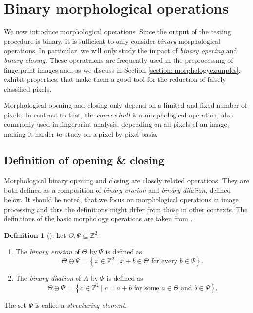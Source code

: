 \documentclass[a4paper,12pt]{article}
\theoremstyle{plain}
\theoremstyle{definition}
\newtheorem{definition}[theorem]{Definition}
\begin{document}
\newpage



\section{Binary morphological operations}\label{section: morphologicaloperations}

We now introduce morphological operations. Since the output of the testing procedure is binary, it is sufficient to only consider \emph{binary} morphological operations. In particular, we will only study the impact of \emph{binary opening} and \emph{binary closing}. These operataions are frequently used in the preprocessing of fingerprint images and, as we discuss in Section \ref{section: morphologyexamples}, exhibit properties, that make them a good tool for the reduction of falsely classified pixels.

Morphological opening and closing only depend on a limited and fixed number of pixels. In contrast to that, the \emph{convex hull} is a morphological operation, also commonly used in fingerprint analysis, depending on all pixels of an image, making it harder to study on a pixel-by-pixel basis.



\subsection{Definition of opening \& closing}

Morphological binary opening and closing are closely related operations. They are both defined as a composition of \emph{binary erosion} and \emph{binary dilation}, defined below. It should be noted, that we focus on morphological operations in image processing and thus the definitions might differ from those in other contexts. The definitions of the basic morphology operations are taken from \cite{imageprocessing}.

\begin{definition}[{\cite[p.~64-68]{imageprocessing}}]
	Let $\Theta, \Psi \subseteq \mathbb{Z}^2$.
	\begin{enumerate}
		\item The \emph{binary erosion} of $\Theta$ by $\Psi$ is defined as
		\begin{equation*}
			\Theta \ominus \Psi = \left\{ x \in \mathbb{Z}^2 \mid x + b \in \Theta \textrm{ for every } b \in \Psi \right\}.
		\end{equation*}
		\item The \emph{binary dilation} of $A$ by $\Psi$ is defined as
		\begin{equation*}
			\Theta \oplus \Psi = \left\{ c \in \mathbb{Z}^2 \mid c = a + b \textrm{ for some } a \in \Theta \textrm{ and } b \in \Psi \right\}.
		\end{equation*}
	\end{enumerate}
	The set $\Psi$ is called a \emph{structuring element}.
\end{definition}
\end{document}
